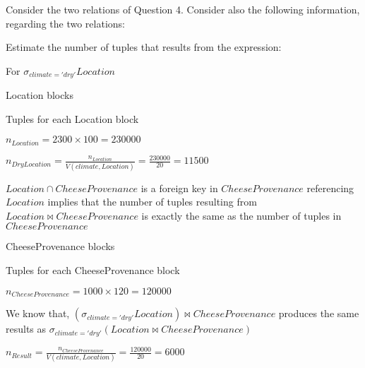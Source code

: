 {\color{gray} Consider the two relations of Question 4. Consider also the following information, regarding the two relations:}


{\color{gray} Estimate the number of tuples that results from the expression:}


\bigskip

For $\sigma_{climate='dry'} Location$
 
 Location blocks

 Tuples for each Location block

\tab $n_{Location} = 2300 \times 100 = 230000 $

\tab $n_{Dry Location} = \frac{n_{Location}}{ V(climate, Location)}=\frac{230000}{20} = 11500 $

\bigskip

$Location ∩ CheeseProvenance$ is a foreign key in $CheeseProvenance$ referencing $Location$ implies that the number of tuples resulting from $Location \bowtie CheeseProvenance$ is exactly the same as the number of tuples in $CheeseProvenance$
 
 CheeseProvenance blocks

 Tuples for each CheeseProvenance block

\tab $n_{CheeseProvenance} = 1000 \times 120 = 120000 $

\bigskip

We know that, $(\sigma_{climate='dry'} Location) \bowtie CheeseProvenance$ produces the same results as $\sigma_{climate='dry'} (Location \bowtie CheeseProvenance)$

\tab $n_{Result} = \frac{n_{CheeseProvenance}}{ V(climate, Location)}=\frac{120000}{20} = 6000 $

